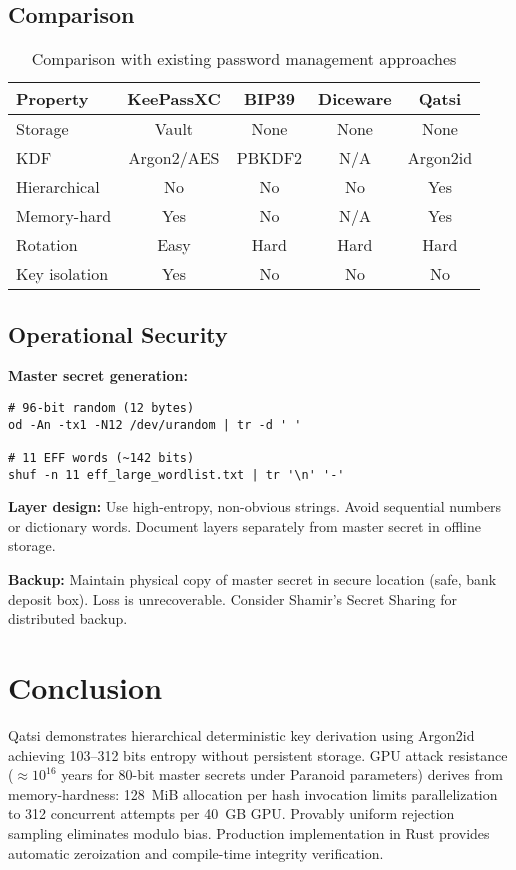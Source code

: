 \documentclass[11pt]{article}
\begin{document}
\subsection{Comparison}

\begin{table}[H]
\centering
\small
\begin{tabular}{@{}lcccc@{}}
\toprule
\textbf{Property} & \textbf{KeePassXC} & \textbf{BIP39} & \textbf{Diceware} & \textbf{Qatsi} \\
\midrule
Storage & Vault & None & None & None \\
KDF & Argon2/AES & PBKDF2 & N/A & Argon2id \\
Hierarchical & No & No & No & Yes \\
Memory-hard & Yes & No & N/A & Yes \\
Rotation & Easy & Hard & Hard & Hard \\
Key isolation & Yes & No & No & No \\
\bottomrule
\end{tabular}
\caption{Comparison with existing password management approaches}
\end{table}

\subsection{Operational Security}

\textbf{Master secret generation:}
\begin{verbatim}
# 96-bit random (12 bytes)
od -An -tx1 -N12 /dev/urandom | tr -d ' '

# 11 EFF words (~142 bits)
shuf -n 11 eff_large_wordlist.txt | tr '\n' '-'
\end{verbatim}

\textbf{Layer design:} Use high-entropy, non-obvious strings. Avoid sequential numbers or dictionary words. Document layers separately from master secret in offline storage.

\textbf{Backup:} Maintain physical copy of master secret in secure location (safe, bank deposit box). Loss is unrecoverable. Consider Shamir's Secret Sharing for distributed backup.

\section{Conclusion}

Qatsi demonstrates hierarchical deterministic key derivation using Argon2id achieving 103--312 bits entropy without persistent storage. GPU attack resistance ($\approx 10^{16}$ years for 80-bit master secrets under Paranoid parameters) derives from memory-hardness: 128~MiB allocation per hash invocation limits parallelization to 312 concurrent attempts per 40~GB GPU. Provably uniform rejection sampling eliminates modulo bias. Production implementation in Rust provides automatic zeroization and compile-time integrity verification.
\end{document}

